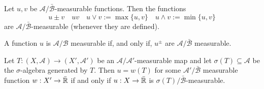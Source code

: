 \begin{thm}
Let \(u,v\) be \(\mathcal{A}/\bar{\mathcal{B}}\)-measurable functions. Then the functions
\[
u\pm v \quad uv\quad u\vee v:=\max\{u,v\}\quad u\wedge v:=\min\{u,v\}
\]
are \(\mathcal{A}/\bar{\mathcal{B}}\)-measurable (whenever they are defined).
\end{thm}

\begin{thm}
A function \(u\) is \(\mathcal{A}/\mathcal{B}\) measurable if, and only if, \(u^\pm \) are \(\mathcal{A}/\bar{\mathcal{B}}\) measurable.
\end{thm}

\begin{thm}
Let \(T:(X,\mathcal{A})\rightarrow (X',\mathcal{A}')\) be an \(\mathcal{A}/\mathcal{A}'\)-measurable map and let \(\sigma (T)\subseteq \mathcal{A}\) be the \(\sigma \)-algebra generated by \(T\). Then \(u=w(T)\) for some \(\mathcal{A}'/\bar{\mathcal{B}}\) measurable function \(w:X'\rightarrow \bar{\Bbb{R}}\) if and only if
\(u:X\rightarrow \bar{\Bbb{R}}\) is \(\sigma (T)/\bar{\mathcal{B}}\)-measurable.
\end{thm}

